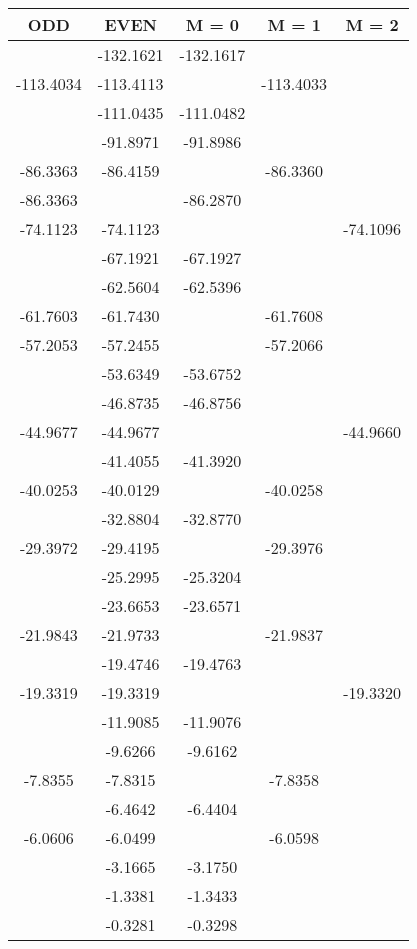 \documentclass[12pt]{article}
\begin{document}
\begin{table}[H]
\begin{center}
\begin{tabular}{ccccc}
\toprule[1.5pt]
ODD & EVEN & M = 0 & M = 1 & M = 2\\ 
\midrule
& -132.1621 & -132.1617 & & \\ 
-113.4034 & -113.4113 & & -113.4033 & \\& -111.0435 & -111.0482 & & \\ 
& -91.8971 & -91.8986 & & \\ 
-86.3363 & -86.4159 & & -86.3360 & \\-86.3363 & & -86.2870 & & \\ 
-74.1123 & -74.1123 & & & -74.1096\\& -67.1921 & -67.1927 & & \\ 
& -62.5604 & -62.5396 & & \\ 
-61.7603 & -61.7430 & & -61.7608 & \\-57.2053 & -57.2455 & & -57.2066 & \\& -53.6349 & -53.6752 & & \\ 
& -46.8735 & -46.8756 & & \\ 
-44.9677 & -44.9677 & & & -44.9660\\& -41.4055 & -41.3920 & & \\ 
-40.0253 & -40.0129 & & -40.0258 & \\& -32.8804 & -32.8770 & & \\ 
-29.3972 & -29.4195 & & -29.3976 & \\& -25.2995 & -25.3204 & & \\ 
& -23.6653 & -23.6571 & & \\ 
-21.9843 & -21.9733 & & -21.9837 & \\& -19.4746 & -19.4763 & & \\ 
-19.3319 & -19.3319 & & & -19.3320\\& -11.9085 & -11.9076 & & \\ 
& -9.6266 & -9.6162 & & \\ 
-7.8355 & -7.8315 & & -7.8358 & \\& -6.4642 & -6.4404 & & \\ 
-6.0606 & -6.0499 & & -6.0598 & \\& -3.1665 & -3.1750 & & \\ 
& -1.3381 & -1.3433 & & \\ 
& -0.3281 & -0.3298 & & \\ 
\bottomrule
\end{tabular}
\end{center}
\end{table}
\end{document}
